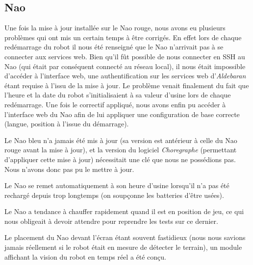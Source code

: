 \subsection{Nao}
\par Une fois la mise à jour installée sur le Nao rouge, nous avons eu plusieurs problèmes qui ont mis un certain temps à être corrigés.
      En effet lors de chaque redémarrage du robot il nous été renseigné que le Nao n’arrivait pas à se connecter aux services web.
      Bien qu’il fût possible de nous connecter en SSH au Nao (qui était par conséquent connecté au réseau local),
      il nous était impossible d’accéder à l’interface web, une authentification sur les services web d’\textit{Aldebaran} étant requise à l'issu de la mise à jour.
      Le problème venait finalement du fait que l’heure et la date du robot s’initialisaient à sa valeur d’usine lors de chaque redémarrage.
      Une fois le correctif appliqué, nous avons enfin pu accéder à l'interface web du Nao afin de lui appliquer une configuration de base correcte (langue, position à l'issue du démarrage).
\par Le Nao bleu n’a jamais été mis à jour (sa version est antérieur à celle du Nao rouge avant la mise à jour),
      et la version du logiciel \textit{Choregraphe} (permettant d’appliquer cette mise à jour) nécessitait une clé que nous ne possédions pas. Nous n'avons donc pas pu le mettre à jour.
\par Le Nao se remet automatiquement à son heure d’usine lorsqu’il n’a pas été rechargé depuis trop longtemps (on soupçonne les batteries d’être usées).
\par Le Nao a tendance à chauffer rapidement quand il est en position de jeu, ce qui nous obligeait à devoir attendre pour reprendre les tests sur ce dernier.
\par Le placement du Nao devant l’écran étant souvent fastidieux (nous nous savions jamais réellement si le robot était en mesure de détecter le terrain), un module affichant la vision du robot en temps réel a été conçu.

